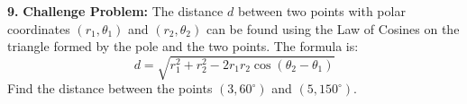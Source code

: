 \documentclass[12pt]{article}
\begin{document}
\textbf{9.} \textbf{Challenge Problem:} The distance $d$ between two points with polar coordinates $(r_1, \theta_1)$ and $(r_2, \theta_2)$ can be found using the Law of Cosines on the triangle formed by the pole and the two points. The formula is:
$$d = \sqrt{r_1^2 + r_2^2 - 2r_1r_2\cos(\theta_2 - \theta_1)}$$
Find the distance between the points $(3, 60^\circ)$ and $(5, 150^\circ)$.
\vspace{5cm}
\end{document}
